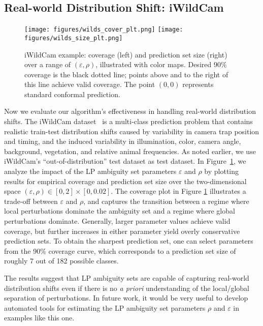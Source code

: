 \documentclass[11pt,a4paper]{article}
\begin{document}

\subsection{Real-world Distribution Shift: iWildCam}
\begin{figure}[t] 
\centering
\texttt{[image: figures/wilds\_cover\_plt.png]}
\texttt{[image: figures/wilds\_size\_plt.png]}
\caption{iWildCam example: coverage (left) and prediction set size (right) over a range of $(\varepsilon,\rho)$, illustrated with color maps. Desired 90\% coverage is the black dotted line; points above and to the right of this line achieve valid coverage. The point $(0,0)$ represents standard conformal prediction.}
\label{fig:wilds_grid}
\end{figure}
Now we evaluate our algorithm's effectiveness in handling real-world distribution shifts. The iWildCam dataset~\cite{Beery_2020} is a multi-class prediction problem that contains realistic train-test distribution shifts caused by variability in camera trap position and timing, and the induced variability in illumination, color, camera angle, background, vegetation, and relative animal frequencies. 
%
As noted earlier, we use iWildCam's ``out-of-distribution'' test dataset as test dataset.
%
In Figure~\ref{fig:wilds_grid}, we analyze the impact of the LP ambiguity set parameters $\varepsilon$ and $\rho$ by plotting results for empirical coverage and prediction set size over the two-dimensional space $(\varepsilon, \rho) \in [0,2] \times [0, 0.02]$.
%
The coverage plot in Figure \ref{fig:wilds_grid} illustrates a trade-off between $\varepsilon$ and $\rho$, and captures the transition between a regime where local perturbations dominate the ambiguity set and a regime where global perturbations dominate. Generally, larger parameter values achieve valid coverage, but further increases in either parameter yield overly conservative prediction sets. To obtain the sharpest prediction set, one can select parameters from the 90\% coverage curve, which corresponds to a prediction set size of roughly 7 out of 182 possible classes.

The results suggest that LP ambiguity sets are capable of capturing real-world distribution shifts even if there is no \textit{a priori} understanding of the local/global separation of perturbations. In future work, it would be very useful to develop automated tools for estimating the LP ambiguity set parameters $\rho$ and $\varepsilon$ in examples like this one.
\end{document}
